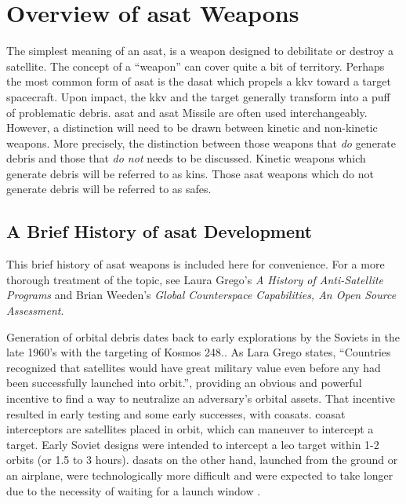 \section{Overview of \acf{asat} Weapons}

The simplest meaning of an \acf{asat}, is a weapon designed to
debilitate or destroy a satellite.  The concept of a ``weapon'' can
cover quite a bit of territory.  Perhaps the most common form of
\ac{asat} is the \ac{dasat} which propels a \ac{kkv} toward a target
spacecraft.  Upon impact, the \ac{kkv} and the target generally
transform into a puff of problematic debris.  \acs{asat} and
\acs{asat} Missile are often used interchangeably.  However, a
distinction will need to be drawn between kinetic and non-kinetic
weapons.  More precisely, the distinction between those weapons that
\emph{do} generate debris and those that \emph{do not} needs to be
discussed.  Kinetic weapons which generate debris will be referred to
as \acp{kin}.  Those \ac{asat} weapons which do not generate debris
will be referred to as \acp{safe}.

\subsection{A Brief History of \ac{asat} Development}

This brief history of \ac{asat} weapons is included here for
convenience.  For a more thorough treatment of the topic, see Laura
Grego's {\it A History of Anti-Satellite Programs}\cite{grego} and
Brian Weeden's {\it Global Counterspace Capabilities, An Open Source
  Assessment}\cite{brian}.

Generation of orbital debris dates back to early explorations by the
Soviets in the late 1960's with the targeting of Kosmos
248.\cite[05-01]{brian}.  As Lara Grego states, ``Countries recognized
that satellites would have great military value even before any had
been successfully launched into orbit.'', providing an obvious and
powerful incentive to find a way to neutralize an adversary's orbital
assets.\cite[2]{grego} That incentive resulted in early testing and
some early successes, with \acp{coasat}.  \acs{coasat} interceptors
are satellites placed in orbit, which can maneuver to intercept a
target.  Early Soviet designs were intended to intercept a \ac{leo}
target within 1-2 orbits (or 1.5 to 3 hours).  \acp{dasat} on the
other hand, launched from the ground or an airplane, were
technologically more difficult\cite[4]{grego} and were expected to
take longer due to the necessity of waiting for a launch window
\cite[3]{grego}.

